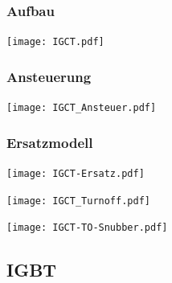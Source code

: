 \documentclass[german]{latex4ei_fs}
\begin{document}
\begin{sectionbox}

\subsubsection*{Aufbau}
\texttt{[image: IGCT.pdf]}
\end{sectionbox}
\begin{sectionbox}
\subsubsection*{Ansteuerung}
\texttt{[image: IGCT\_Ansteuer.pdf]}
\end{sectionbox}
\begin{sectionbox}
\subsubsection*{Ersatzmodell}
\texttt{[image: IGCT-Ersatz.pdf]}

\end{sectionbox}
\begin{sectionbox}
\texttt{[image: IGCT\_Turnoff.pdf]}

\end{sectionbox}
\begin{sectionbox}
\texttt{[image: IGCT-TO-Snubber.pdf]}

\end{sectionbox}



\subsection{IGBT}
\end{document}
